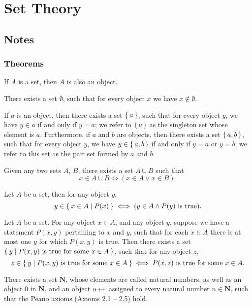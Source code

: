 \section{Set Theory}
\subsection{Notes}
\subsubsection{Theorems}
\begin{axiom}
    If $A$ is a set, then $A$ is also an object.
\end{axiom}
\begin{axiom}
    There exists a set $\emptyset$, such that for every object $x$ we have $x \notin \emptyset$.
\end{axiom}
\begin{axiom}
    If $a$ is an object, then there exists a set $\set{a}$, such that for every object $y$, we have $y\in{a}$ if and only if $y=a$; we refer to $\set{a}$ as the singleton set whose element is $a$. Furthermore, if $a$ and $b$ are objects, then there exists a set $\set{a, b}$, such that for every object $y$, we have $y \in \set{a, b}$ if and only if $y = a$ or $y = b$; we refer to this set as the pair set formed by $a$ and $b$.
\end{axiom}
\begin{axiom}
    Given any two sets $A$, $B$, there exists a set $A \cup B$ such that \[x\in A\cup B \iff (x\in A \lor x\in B).\]
\end{axiom}
\begin{axiom}
    Let $A$ be a set, then for any object $y$, \[y\in \Set{x\in A | P(x)} \iff (y\in A \land P(y) \text{ is true}).\] 
\end{axiom}
\begin{axiom}[Replacement]
    Let $A$ be a set. For any object $x \in A$, and any object $y$, suppose we have a statement $P(x,y)$ pertaining to $x$ and $y$, such that for each $x \in A$ there is at most one $y$ for which $P(x,y)$ is true. Then there exists a set $\Set{y | P (x, y) \text{ is true for some } x \in A}$, such that for any object $z$, \[z \in \Set{y | P(x,y)\text{ is true for some }x \in A} \iff P(x,z)\text{ is true for some }x \in A.\]
\end{axiom}
\begin{axiom}[Infinity]
    There exists a set $\mathbf{N}$, whose elements are called natural numbers, as well as an object $0$ in $\mathbf{N}$, and an object $n{+}{\mkern-4mu}{+}$ assigned to every natural number $n \in \mathbf{N}$, such that the Peano axioms (Axioms 2.1 -- 2.5) hold.
\end{axiom}

